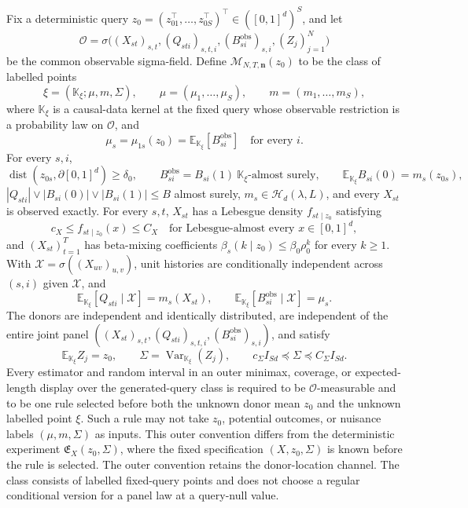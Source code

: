 Fix a deterministic query
\(z_0=(z_{01}^{\top},\ldots,z_{0S}^{\top})^{\top}\in([0,1]^d)^S\), and let
\[
 \mathcal O=\sigma\bigl((X_{st})_{s,t},(Q_{sti})_{s,t,i},
 (B_{si}^{\mathrm{obs}})_{s,i},(Z_j)_{j=1}^{N}\bigr)
\]
be the common observable sigma-field.  Define
\(\mathcal M_{N,T,\mathbf n}(z_0)\) to be the class of labelled points
\[
 \xi=(\mathbb K_\xi;\mu,m,\Sigma),
 \qquad \mu=(\mu_1,\ldots,\mu_S),
 \qquad m=(m_1,\ldots,m_S),                                    \tag{1}
\]
where \(\mathbb K_\xi\) is a causal-data kernel at the fixed query whose
observable restriction is a probability law on \(\mathcal O\), and
\[
 \mu_s=\mu_{1s}(z_0)
 =\mathbb E_{\mathbb K_\xi}[B_{si}^{\mathrm{obs}}]
 \quad\text{for every }i.                                      \tag{2}
\]
For every \(s,i\),
\[
 \operatorname{dist}(z_{0s},\partial[0,1]^d)\ge\delta_0,
 \qquad B_{si}^{\mathrm{obs}}=B_{si}(1)
     \ \mathbb K_\xi\text{-almost surely},
 \qquad \mathbb E_{\mathbb K_\xi}B_{si}(0)=m_s(z_{0s}),       \tag{3}
\]
\(|Q_{sti}|\vee|B_{si}(0)|\vee|B_{si}(1)|\le B\) almost
surely, \(m_s\in\mathcal H_d(\lambda,L)\), and every \(X_{st}\) is
observed exactly.  For every \(s,t\), \(X_{st}\) has a Lebesgue density
\(f_{st\mid z_0}\) satisfying
\[
 c_X\le f_{st\mid z_0}(x)\le C_X
 \quad\text{for Lebesgue-almost every }x\in[0,1]^d,             \tag{4}
\]
and \((X_{st})_{t=1}^{T}\) has beta-mixing coefficients
\(\beta_s(k\mid z_0)\le\beta_0\rho_0^k\) for every \(k\ge1\).  With
\(\mathcal X=\sigma((X_{uv})_{u,v})\), unit histories are conditionally
independent across \((s,i)\) given \(\mathcal X\), and
\[
 \mathbb E_{\mathbb K_\xi}[Q_{sti}\mid\mathcal X]=m_s(X_{st}),
 \qquad
 \mathbb E_{\mathbb K_\xi}[B_{si}^{\mathrm{obs}}\mid\mathcal X]=\mu_s.
                                                                    \tag{5}
\]
The donors are independent and identically distributed, are independent of
the entire joint panel
\(((X_{st})_{s,t},(Q_{sti})_{s,t,i},(B_{si}^{\mathrm{obs}})_{s,i})\), and
satisfy
\[
 \mathbb E_{\mathbb K_\xi}Z_j=z_0,
 \qquad \Sigma=\operatorname{Var}_{\mathbb K_\xi}(Z_j),
 \qquad c_\Sigma I_{Sd}\preceq\Sigma\preceq C_\Sigma I_{Sd}.  \tag{6}
\]
Every estimator and random interval in an outer minimax, coverage, or
expected-length display over the generated-query class is required to be
\(\mathcal O\)-measurable and to be one rule selected before both the unknown
donor mean \(z_0\) and the unknown labelled point \(\xi\).  Such a rule may
not take \(z_0\), potential outcomes, or nuisance labels \((\mu,m,\Sigma)\)
as inputs.  This outer convention differs from the deterministic experiment
\(\mathfrak E_X(z_0,\Sigma)\), where the fixed specification
\((X,z_0,\Sigma)\) is known before the rule is selected.  The outer
convention retains the donor-location channel.  The class consists of
labelled fixed-query points and does not choose a regular conditional version
for a panel law at a query-null value.

